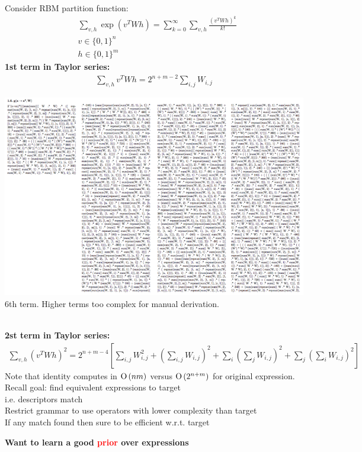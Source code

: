 \documentclass[landscape,a0b]{a0poster_csml_v2}
\begin{document}
\begin{poster}
\begin{PosterColumn}
\begin{minipage}[hc]{0.57\textwidth}
  Consider RBM partition function:
  \begin{align*}
    &\sum_{v,h} \exp(v^TWh) = \sum_{k=0}^\infty \sum_{v,h} \frac{(v^TWh)^k}{k!}\\
    &v \in \{0, 1\}^n\\
    &h \in \{0, 1\}^m
  \end{align*}
  {\bf 1st term in Taylor series:}
  \begin{align*}
    \sum_{v,h} v^TWh = 2^{n + m - 2} \sum_{i, j}W_{i, j}
  \end{align*}
\end{minipage}
\hfill
\begin{minipage}[hc]{0.37\textwidth}
  \centering
  \includegraphics[width=\linewidth]{imgs/6th.png}
  6th term.
  Higher terms too complex for manual derivation. 
\end{minipage}
\vspace{0.5cm}
\\
  {\bf 2st term in Taylor series:}
  \begin{align*}
    \sum_{v,h} (v^TWh)^2 = 2^{n + m - 4} [\sum_{i, j}W_{i, j}^2 + (\sum_{i, j} W_{i, j})^2 + \sum_i (\sum_j W_{i, j})^2 + \sum_j (\sum_i W_{i, j})^2]
  \end{align*}
  Note that identity computes in $\operatorname{O}\left(nm\right)$ versus $\operatorname{O}\left(2^{n + m}\right)$ for original expression.
\vspace{0.1cm}
Recall goal: find equivalent expressions to target  \\
i.e. descriptors match \\
Restrict grammar to use operators with lower complexity than target \\
If any match found then sure to be efficient w.r.t. target \\
\vspace{-1cm}
\begin{center}
{\bf Want to learn a good \textcolor{red}{prior} over expressions}
\end{center}


\end{PosterColumn}
\end{poster}
\end{document}
